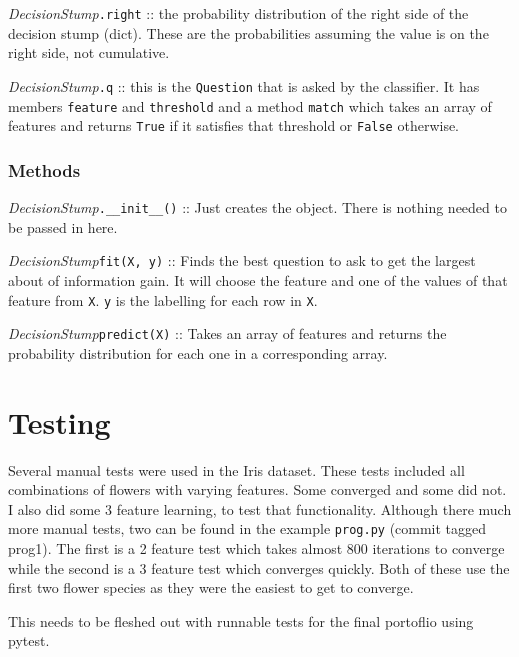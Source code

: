 \documentclass{article}
\begin{document}
\textit{DecisionStump}\texttt{.right} :: the probability distribution of the right side of the decision stump (dict).
These are the probabilities assuming the value is on the right side, not cumulative.

\textit{DecisionStump}\texttt{.q} :: this is the \texttt{Question} that is asked by the classifier. It has members \texttt{feature} and \texttt{threshold} and a method \texttt{match} which takes an array of features and returns \texttt{True} if it satisfies that threshold or \texttt{False} otherwise.

\subsubsection{Methods}

\textit{DecisionStump}\texttt{.\_\_init\_\_()} :: Just creates the object. There is nothing needed to be passed in here.

\textit{DecisionStump}\texttt{fit(X, y)} :: Finds the best question to ask to get the largest about of information gain. It will choose the feature and one of the values of that feature from \texttt{X}. \texttt{y} is the labelling for each row in \texttt{X}.

\textit{DecisionStump}\texttt{predict(X)} :: Takes an array of features and returns the probability distribution for each one in a corresponding array.

\section{Testing}

Several manual tests were used in the Iris dataset. These tests included all
combinations of flowers with varying features. Some converged and some did not.
I also did some 3 feature learning, to test that functionality. Although there
much more manual tests, two can be found in the example \texttt{prog.py} (commit
tagged prog1). The first is a 2 feature test which takes almost 800 iterations
to converge while the second is a 3 feature test which converges quickly. Both
of these use the first two flower species as they were the easiest to get to
converge.

This needs to be fleshed out with runnable tests for the final portoflio using pytest.
\end{document}
